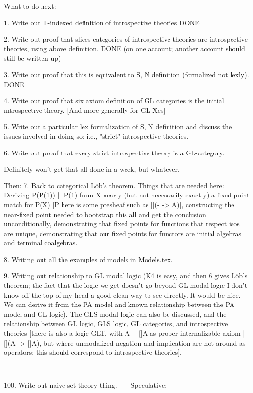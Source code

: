 What to do next:

1. Write out T-indexed definition of introspective theories
DONE

2. Write out proof that slices categories of introspective theories are introspective theories, using above definition.
DONE (on one account; another account should still be written up)

3. Write out proof that this is equivalent to S, N definition (formalized not lexly).
DONE

4. Write out proof that six axiom definition of GL categories is the initial introspective theory. [And more generally for GL-Xes]

5. Write out a particular lex formalization of S, N definition and discuss the issues involved in doing so; i.e., "strict" introspective theories.

6. Write out proof that every strict introspective theory is a GL-category.

Definitely won't get that all done in a week, but whatever.

Then:
7. Back to categorical Löb's theorem. Things that are needed here: Deriving P(P(1)) |- P(1) from X nearly (but not necessarily exactly) a fixed point match for P(X) [P here is some presheaf such as [](- -> A)], constructing the near-fixed point needed to bootstrap this all and get the conclusion unconditionally, demonstrating that fixed points for functions that respect isos are unique, demonstrating that our fixed points for functors are initial algebras and terminal coalgebras.

8. Writing out all the examples of models in Models.tex.

9. Writing out relationship to GL modal logic (K4 is easy, and then 6 gives Löb's theorem; the fact that the logic we get doesn't go beyond GL modal logic I don't know off the top of my head a good clean way to see directly. It would be nice. We can derive it from the PA model and known relationship between the PA model and GL logic). The GLS modal logic can also be discussed, and the relationship between GL logic, GLS logic, GL categories, and introspective theories [there is also a logic GLT, with A |- []A as proper internalizable axiom |- [](A -> []A), but where unmodalized negation and implication are not around as operators; this should correspond to introspective theories].

...

100. Write out naive set theory thing.
----
Speculative:

